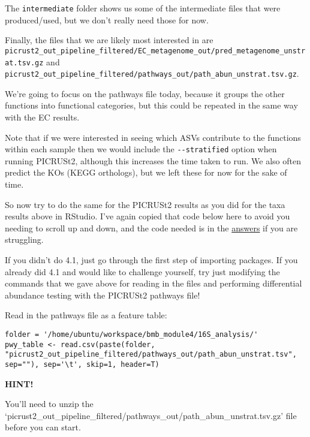\documentclass[
]{book}
\newenvironment{redbox}{
  \definecolor{shadecolor}{RGB}{243, 154, 157}
  \color{white}
  \begin{shaded}}
 {\end{shaded}}
\begin{document}
The \texttt{intermediate} folder shows us some of the intermediate files that were produced/used, but we don't really need those for now.

Finally, the files that we are likely most interested in are \texttt{picrust2\_out\_pipeline\_filtered/EC\_metagenome\_out/pred\_metagenome\_unstrat.tsv.gz} and \texttt{picrust2\_out\_pipeline\_filtered/pathways\_out/path\_abun\_unstrat.tsv.gz}.

We're going to focus on the pathways file today, because it groups the other functions into functional categories, but this could be repeated in the same way with the EC results.

Note that if we were interested in seeing which ASVs contribute to the functions within each sample then we would include the \texttt{-\/-stratified} option when running PICRUSt2, although this increases the time taken to run. We also often predict the KOs (KEGG orthologs), but we left these for now for the sake of time.

So now try to do the same for the PICRUSt2 results as you did for the taxa results above in RStudio. I've again copied that code below here to avoid you needing to scroll up and down, and the code needed is in the \hyperref[answers]{answers} if you are struggling.

If you didn't do 4.1, just go through the first step of importing packages. If you already did 4.1 and would like to challenge yourself, try just modifying the commands that we gave above for reading in the files and performing differential abundance testing with the PICRUSt2 pathways file!

Read in the pathways file as a feature table:

\begin{verbatim}
folder = '/home/ubuntu/workspace/bmb_module4/16S_analysis/'
pwy_table <- read.csv(paste(folder, "picrust2_out_pipeline_filtered/pathways_out/path_abun_unstrat.tsv", sep=""), sep='\t', skip=1, header=T)
\end{verbatim}

\begin{redbox}

\begin{center}
\textbf{HINT!}

\end{center}

You'll need to unzip the `picrust2\_out\_pipeline\_filtered/pathways\_out/path\_abun\_unstrat.tsv.gz' file before you can start.

\end{redbox}
\end{document}
